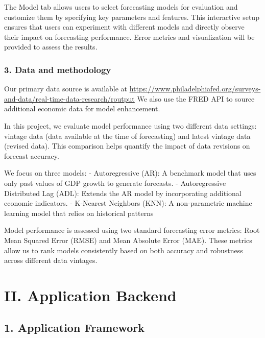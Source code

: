 \documentclass[
]{article}
\begin{document}
The Model tab allows users to select forecasting models for evaluation
and customize them by specifying key parameters and features. This
interactive setup ensures that users can experiment with different
models and directly observe their impact on forecasting performance.
Error metrics and visualization will be provided to assess the results.

\hypertarget{data-and-methodology}{%
\subsubsection{3. Data and methodology}\label{data-and-methodology}}

Our primary data source is available at
\url{https://www.philadelphiafed.org/surveys-and-data/real-time-data-research/routput}
We also use the FRED API to source additional economic data for model
enhancement.

In this project, we evaluate model performance using two different data
settings: vintage data (data available at the time of forecasting) and
latest vintage data (revised data). This comparison helps quantify the
impact of data revisions on forecast accuracy.

We focus on three models: - Autoregressive (AR): A benchmark model that
uses only past values of GDP growth to generate forecasts. -
Autoregressive Distributed Lag (ADL): Extends the AR model by
incorporating additional economic indicators. - K-Nearest Neighbors
(KNN): A non-parametric machine learning model that relies on historical
patterns

Model performance is assessed using two standard forecasting error
metrics: Root Mean Squared Error (RMSE) and Mean Absolute Error (MAE).
These metrics allow us to rank models consistently based on both
accuracy and robustness across different data vintages.

\hypertarget{ii.-application-backend}{%
\section{II. Application Backend}\label{ii.-application-backend}}

\hypertarget{application-framework}{%
\subsection{1. Application Framework}\label{application-framework}}
\end{document}
